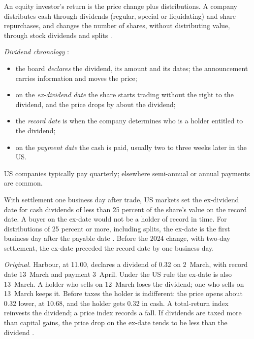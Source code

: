\begin{qfdefinition}\label{def:corporate-distribution-mechanics}
 An equity investor's return is the price change plus distributions. A company distributes cash through dividends (regular, special or liquidating) and share repurchases, and changes the number of shares, without distributing value, through stock dividends and splits \citep[pp.~438--439, 473]{applied-corporate-finance-2014}.

\emph{Dividend chronology} \citep[pp.~438--439]{applied-corporate-finance-2014}:
\begin{itemize}
\item the board \emph{declares} the dividend, its amount and its dates; the announcement carries information and moves the price;
\item on the \emph{ex-dividend date} the share starts trading without the right to the dividend, and the price drops by about the dividend;
\item the \emph{record date} is when the company determines who is a holder entitled to the dividend;
\item on the \emph{payment date} the cash is paid, usually two to three weeks later in the US.
\end{itemize}
US companies typically pay quarterly; elsewhere semi-annual or annual payments are common.

With settlement one business day after trade, US markets set the ex-dividend date for cash dividends of less than 25 percent of the share's value on the record date. A buyer on the ex-date would not be a holder of record in time. For distributions of 25 percent or more, including splits, the ex-date is the first business day after the payable date \citep[paras.~(b)(1)--(b)(2)]{finra-rule-11140}. Before the 2024 change, with two-day settlement, the ex-date preceded the record date by one business day.

 \emph{Original.} Harbour, at 11.00, declares a dividend of 0.32 on 2~March, with record date 13~March and payment 3~April. Under the US rule the ex-date is also 13~March. A holder who sells on 12~March loses the dividend; one who sells on 13~March keeps it. Before taxes the holder is indifferent: the price opens about 0.32 lower, at 10.68, and the holder gets 0.32 in cash. A total-return index reinvests the dividend; a price index records a fall. If dividends are taxed more than capital gains, the price drop on the ex-date tends to be less than the dividend \citep[pp.~454--455]{applied-corporate-finance-2014}.


\end{qfdefinition}
